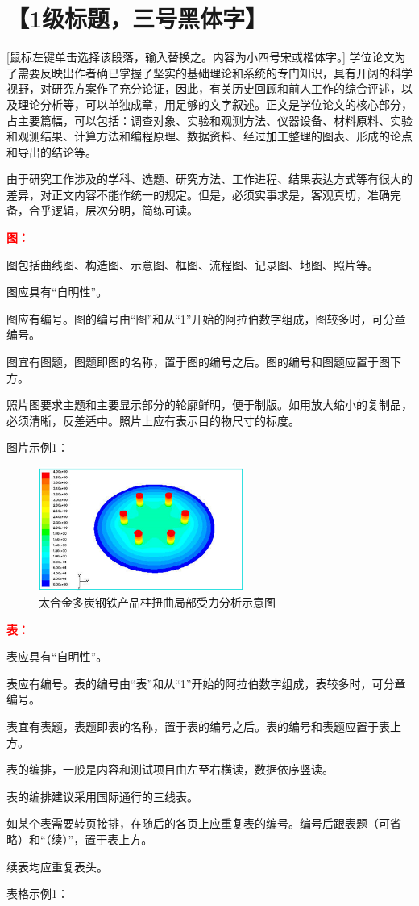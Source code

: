 \documentclass{bjtuthesis}
\begin{document}
\chapter{【1级标题，三号黑体字】}
 [鼠标左键单击选择该段落，输入替换之。内容为小四号宋或楷体字。] 学位论文为了需要反映出作者确已掌握了坚实的基础理论和系统的专门知识，具有开阔的科学视野，对研究方案作了充分论证，因此，有关历史回顾和前人工作的综合评述，以及理论分析等，可以单独成章，用足够的文字叙述。正文是学位论文的核心部分，占主要篇幅，可以包括：调查对象、实验和观测方法、仪器设备、材料原料、实验和观测结果、计算方法和编程原理、数据资料、经过加工整理的图表、形成的论点和导出的结论等。\par
由于研究工作涉及的学科、选题、研究方法、工作进程、结果表达方式等有很大的差异，对正文内容不能作统一的规定。但是，必须实事求是，客观真切，准确完备，合乎逻辑，层次分明，简练可读。\par
\textcolor{red}{\textbf{图：}}\par
图包括曲线图、构造图、示意图、框图、流程图、记录图、地图、照片等。\par
图应具有“自明性”。\par
图应有编号。图的编号由“图”和从“1”开始的阿拉伯数字组成，图较多时，可分章编号。\par
图宜有图题，图题即图的名称，置于图的编号之后。图的编号和图题应置于图下方。\par
照片图要求主题和主要显示部分的轮廓鲜明，便于制版。如用放大缩小的复制品，必须清晰，反差适中。照片上应有表示目的物尺寸的标度。\par
图片示例1：
\begin{figure}[!htp]
    \centering
    \includegraphics[width=0.6\textwidth]{pic/pic2-1.png}
    \caption{太合金多炭钢铁产品柱扭曲局部受力分析示意图\label{fig:2-1}}
\end{figure}

\textcolor{red}{\textbf{表：}}\par
表应具有“自明性”。\par
表应有编号。表的编号由“表”和从“1”开始的阿拉伯数字组成，表较多时，可分章编号。\par
表宜有表题，表题即表的名称，置于表的编号之后。表的编号和表题应置于表上方。\par
表的编排，一般是内容和测试项目由左至右横读，数据依序竖读。\par
表的编排建议采用国际通行的三线表。\par
如某个表需要转页接排，在随后的各页上应重复表的编号。编号后跟表题（可省略）和“（续）”，置于表上方。\par
续表均应重复表头。\par
表格示例1：
\end{document}
